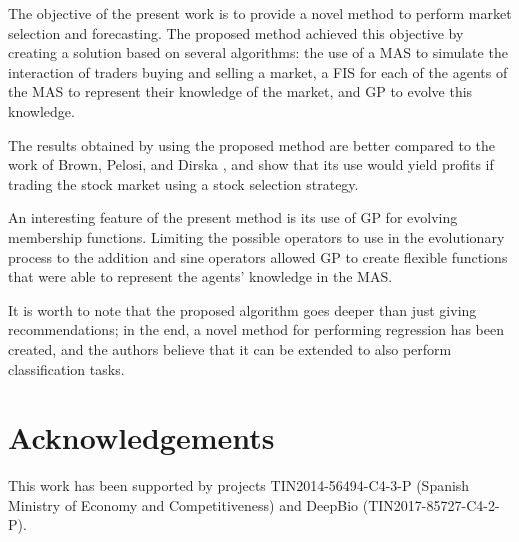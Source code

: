 \documentclass[a4paper,twoside]{article}
\begin{document}
The objective of the present work is to provide a novel method to
perform market selection and forecasting. The proposed method achieved
this objective by creating a solution based on several algorithms: the
use of a MAS to simulate the interaction of traders buying and selling
a market, a FIS for each of the agents of the MAS to represent their
knowledge of the market, and GP to evolve this knowledge.

The results obtained by using the proposed method are better compared
to the work of Brown, Pelosi, and Dirska \cite{brown2013dynamic}, and
show that its use would yield profits if trading the stock market
using a stock selection strategy.

An interesting feature of the present method is its use of GP for
evolving membership functions. Limiting the possible operators to use
in the evolutionary process to the addition and sine operators allowed
GP to create flexible functions that were able to represent the
agents' knowledge in the MAS.

It is worth to note that the proposed algorithm goes deeper than just
giving recommendations; in the end, a novel method for performing
regression has been created, and the authors believe that it can be
extended to also perform classification tasks.


\section{Acknowledgements}

This work has been supported by
projects TIN2014-56494-C4-3-P (Spanish Ministry of Economy and
Competitiveness) and DeepBio (TIN2017-85727-C4-2-P).



\end{document}
